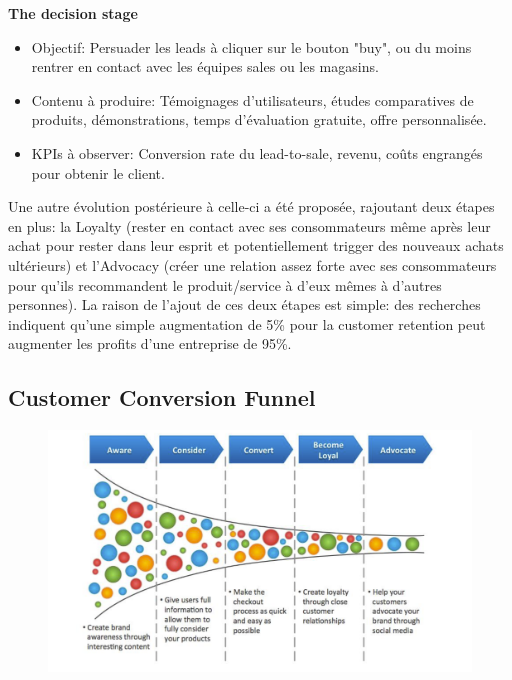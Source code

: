 \textbf{The decision stage}

\begin{itemize}
    \item Objectif: Persuader les leads à cliquer sur le bouton "buy", ou du moins rentrer en contact avec les équipes sales ou les magasins.
    \item Contenu à produire: Témoignages d'utilisateurs, études comparatives de produits, démonstrations, temps d'évaluation gratuite, offre personnalisée.
    \item KPIs à observer: Conversion rate du lead-to-sale, revenu, coûts engrangés pour obtenir le client.\\
\end{itemize}

Une autre évolution postérieure à celle-ci a été proposée, rajoutant deux étapes en plus: la Loyalty (rester en contact avec ses consommateurs même après leur achat pour rester dans leur esprit et potentiellement trigger des nouveaux achats ultérieurs) et l'Advocacy (créer une relation assez forte avec ses consommateurs pour qu'ils recommandent le produit/service à d'eux mêmes à d'autres personnes). La raison de l'ajout de ces deux étapes est simple: des recherches indiquent qu'une simple augmentation de 5\% pour la customer retention peut augmenter les profits d'une entreprise de 95\%. \\

\subsection{Customer Conversion Funnel}

\begin{figure}[H]
\hspace{-2cm}
\includegraphics[scale=0.40]{../images/lec6img2}
\end{figure}

